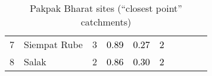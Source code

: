 \begin{table}[ht]
\begin{tabular}{C{0.05\textwidth}C{0.15\textwidth}C{0.08\textwidth}C{0.08\textwidth}C{0.08\textwidth}C{0.08\textwidth}C{0.08\textwidth}C{0.08\textwidth}C{0.08\textwidth}C{0.08\textwidth}}
  {7} & Siempat Rube &   3 & \textcolor[HTML]{000000}{0.89} & \textcolor[HTML]{000000}{0.27} & \textcolor[HTML]{000000}{2} &  &  &  &  \\ 
  {8} & Salak &   2 & \textcolor[HTML]{000000}{0.86} & \textcolor[HTML]{000000}{0.30} & \textcolor[HTML]{000000}{2} &  &  &  &  \\ 
  \end{tabular}
\endgroup
\caption{Pakpak Bharat sites (``closest point'' catchments)} 
\end{table}
